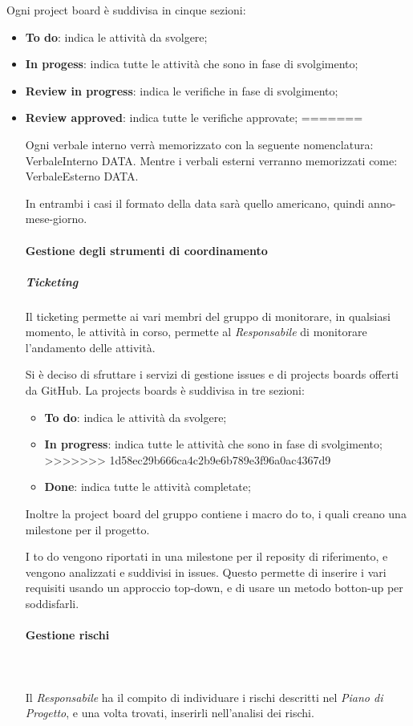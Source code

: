    					Ogni project board è suddivisa in cinque sezioni:
   					\begin{itemize}
   						\item \textbf{To do}: indica le attività da svolgere;
   						\item \textbf{In progess}: indica tutte le attività che sono in fase di svolgimento;
   						\item \textbf{Review in progress}: indica le verifiche in fase di svolgimento;
   						\item \textbf{Review approved}: indica tutte le verifiche approvate;
=======

   					Ogni verbale interno verrà memorizzato con la seguente nomenclatura: VerbaleInterno DATA.
   					Mentre i verbali esterni verranno memorizzati come: VerbaleEsterno DATA.

   					In entrambi i casi il formato della data sarà quello americano, quindi anno-mese-giorno.
   			\paragraph{Gestione degli strumenti di coordinamento}
   				\subparagraph{Ticketing}
   					Il ticketing permette ai vari membri del gruppo di monitorare, in qualsiasi momento, le attività in corso, permette al \textit{Responsabile} di monitorare l'andamento delle attività.

   					Si è deciso di sfruttare i servizi di gestione issues e di projects boards offerti da GitHub\glos.
   					La projects boards è suddivisa in tre sezioni:
   					\begin{itemize}
   						\item \textbf{To do}: indica le attività da svolgere;
   						\item \textbf{In progress}: indica tutte le attività che sono in fase di svolgimento;
>>>>>>> 1d58ec29b666ca4c2b9e6b789e3f96a0ac4367d9
   						\item \textbf{Done}: indica tutte le attività completate;
   					\end{itemize}
   					Inoltre la project board del gruppo contiene i macro do to, i quali creano una milestone per il progetto.
   					
   					I to do vengono riportati in una milestone per il reposity di riferimento, e vengono analizzati e suddivisi in issues. Questo permette di inserire i vari requisiti usando un approccio top-down, e di usare un metodo botton-up per soddisfarli. 
   			\paragraph{Gestione rischi}\mbox{}\\ \mbox{}\\
   				Il \textit{Responsabile} ha il compito di individuare i rischi descritti nel \textit{Piano di Progetto}, e una volta trovati, inserirli nell'analisi dei rischi.


\end{itemize}
